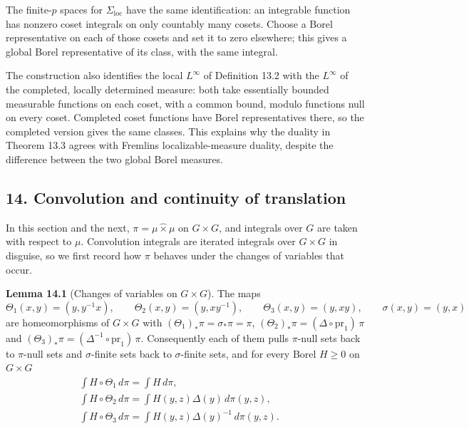 \documentclass[
  english,
  11pt,
  a4paper,
]{article}
\begin{document}
The finite-\(p\) spaces for \(\Sigma_{\mathrm{loc}}\) have the same
identification: an integrable function has nonzero coset integrals on
only countably many cosets. Choose a Borel representative on each of
those cosets and set it to zero elsewhere; this gives a global Borel
representative of its class, with the same integral.

The construction also identifies the local \(L^\infty\) of Definition
13.2 with the \(L^\infty\) of the completed, locally determined measure:
both take essentially bounded measurable functions on each coset, with a
common bound, modulo functions null on every coset. Completed coset
functions have Borel representatives there, so the completed version
gives the same classes. This explains why the duality in Theorem 13.3
agrees with Fremlin\textquotesingle s localizable-measure duality,
despite the difference between the two global Borel measures.

\subsection[14. Convolution and continuity of
translation]{\texorpdfstring{\protect\hypertarget{haar-measure-on-locally-compact-groups--oa-fnd-hm-12}{}{}14.
Convolution and continuity of
translation}{14. Convolution and continuity of translation}}\label{haar-measure-on-locally-compact-groups--OA-FND-HM-12}

In this section and the next, \(\pi=\mu\hat\times\mu\) on \(G\times G\),
and integrals over \(G\) are taken with respect to \(\mu\). Convolution
integrals are iterated integrals over \(G\times G\) in disguise, so we
first record how \(\pi\) behaves under the changes of variables that
occur.

\textbf{Lemma 14.1} (Changes of variables on \(G\times G\)). The maps
\[\Theta_1(x,y)=(y,y^{-1}x),\qquad\Theta_2(x,y)=(y,xy^{-1}),\qquad\Theta_3(x,y)=(y,xy),\qquad\sigma(x,y)=(y,x)\]
are homeomorphisms of \(G\times G\) with
\((\Theta_1)_*\pi=\sigma_*\pi=\pi\),
\((\Theta_2)_*\pi=(\Delta\circ\mathrm{pr}_1)\,\pi\) and
\((\Theta_3)_*\pi=(\Delta^{-1}\circ\mathrm{pr}_1)\,\pi\). Consequently
each of them pulls \(\pi\)-null sets back to \(\pi\)-null sets and
\(\sigma\)-finite sets back to \(\sigma\)-finite sets, and for every
Borel \(H\geq0\) on \(G\times G\)
\[\begin{gathered}
\int H\circ\Theta_1\,d\pi=\int H\,d\pi,\qquad\\
\int H\circ\Theta_2\,d\pi=\int H(y,z)\Delta(y)\,d\pi(y,z),\qquad\\
\int H\circ\Theta_3\,d\pi=\int H(y,z)\Delta(y)^{-1}\,d\pi(y,z).
\end{gathered}\]
\end{document}
